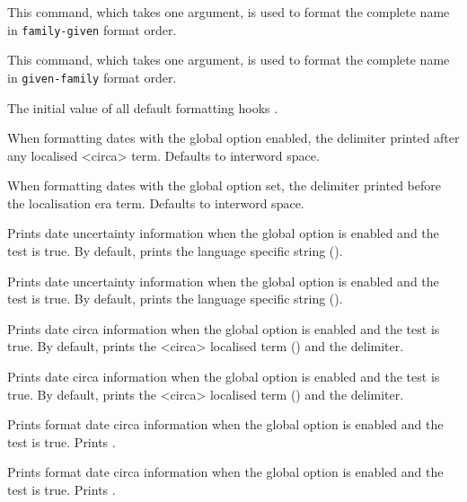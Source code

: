 \begin{ltxsyntax}
This command, which takes one argument, is used to format the complete name in \texttt{family-given} format order.

This command, which takes one argument, is used to format the complete name in \texttt{given-family} format order.

The initial value of all default formatting hooks .

\CSdelimMark
When formatting dates with the global option  enabled, the delimiter printed after any localised <circa> term. Defaults to interword space.

\CSdelimMark
When formatting dates with the global option  set, the delimiter printed before the localisation era term. Defaults to interword space.

Prints date uncertainty information when the global option  is enabled and the  test is true. By default, prints the language specific  string ().

Prints date uncertainty information when the global option  is enabled and the  test is true. By default, prints the language specific  string ().

Prints date circa information when the global option  is enabled and the  test is true. By default, prints the <circa> localised term () and the  delimiter.

Prints date circa information when the global option  is enabled and the  test is true. By default, prints the <circa> localised term () and the  delimiter.

Prints  format date circa information when the global option  is enabled and the  test is true. Prints .

Prints  format date circa information when the global option  is enabled and the  test is true. Prints .


\end{ltxsyntax}
